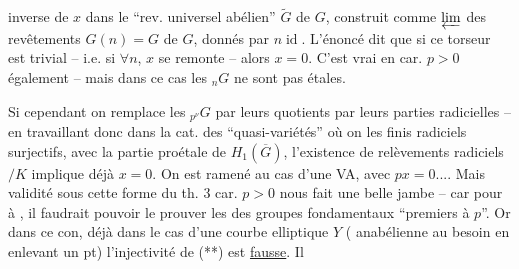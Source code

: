 inverse de $x$ dans le ``rev. universel abélien'' $\widetilde G$ de $G$, construit comme $\varprojlim$ des revêtements $G(n)=G$ de $G$, donnés par $n\operatorname{id}$. L'énoncé dit que si ce torseur est trivial -- i.e. si $\forall n$, $x$ se remonte -- alors $x=0$. C'est vrai en car. $p>0$ également -- mais dans ce cas les ${}_nG$ ne sont pas étales.


Si cependant on remplace les ${}_{p^\nu}G$ par leurs quotients par leurs parties radicielles -- en travaillant donc dans la cat. des ``quasi-variétés'' où on   les   finis radiciels surjectifs,   avec la partie proétale de $H_1(\overline G)$,  l'existence de relèvements radiciels $/K$ implique déjà $x=0$.  On est ramené au cas d'une VA, avec $px=0$.... Mais  validité sous cette forme du th. 3   car. $p>0$ nous fait une belle jambe -- car pour  à , il faudrait pouvoir le prouver   les  des groupes fondamentaux ``premiers à $p$''. Or dans ce con, déjà dans le cas d'une courbe elliptique $Y$ (  anabélienne au besoin en enlevant un pt) l'injectivité de (**) est \uline{fausse}. Il

